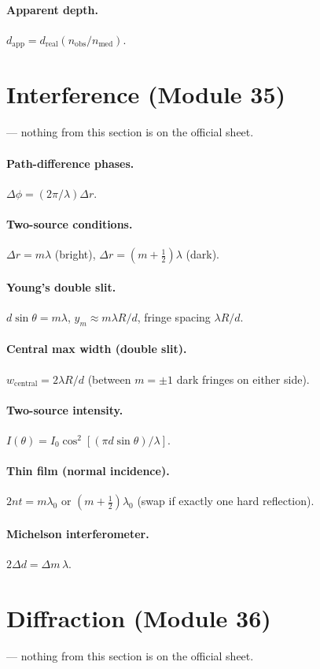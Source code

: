 \documentclass[11pt]{article}
\begin{document}
\paragraph{Apparent depth.} $d_{\text{app}} = d_{\text{real}}(n_{\text{obs}}/n_{\text{med}})$.

\section{Interference (Module 35)}
 --- nothing from this section is on the official sheet.

\paragraph{Path-difference phases.} $\Delta\phi = (2\pi/\lambda)\Delta r$.
\paragraph{Two-source conditions.}
$\Delta r = m\lambda$ (bright), $\Delta r = (m + \tfrac{1}{2})\lambda$ (dark).
\paragraph{Young's double slit.}
$d\sin\theta = m\lambda$, $y_m \approx m\lambda R/d$, fringe spacing $\lambda R/d$.
\paragraph{Central max width (double slit).} $w_{\text{central}} = 2\lambda R/d$ (between $m=\pm 1$ dark fringes on either side).
\paragraph{Two-source intensity.} $I(\theta) = I_0\cos^{2}[(\pi d\sin\theta)/\lambda]$.
\paragraph{Thin film (normal incidence).}
$2 n t = m\lambda_0$ or $(m + \tfrac{1}{2})\lambda_0$ (swap if exactly one hard reflection).
\paragraph{Michelson interferometer.} $2\Delta d = \Delta m\,\lambda$.

\section{Diffraction (Module 36)}
 --- nothing from this section is on the official sheet.
\end{document}
